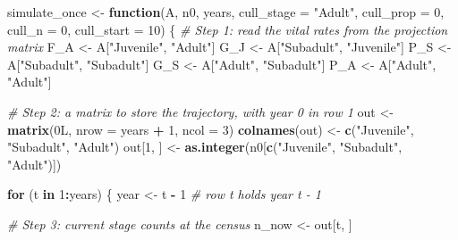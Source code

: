 \documentclass[
  a4paper]{book}
\newenvironment{Shaded}{\begin{snugshade}}{\end{snugshade}}
\newcommand{\AttributeTok}[1]{\textcolor[rgb]{0.13,0.29,0.53}{#1}}
\newcommand{\CommentTok}[1]{\textcolor[rgb]{0.56,0.35,0.01}{\textit{#1}}}
\newcommand{\ControlFlowTok}[1]{\textcolor[rgb]{0.13,0.29,0.53}{\textbf{#1}}}
\newcommand{\DataTypeTok}[1]{\textcolor[rgb]{0.13,0.29,0.53}{#1}}
\newcommand{\DecValTok}[1]{\textcolor[rgb]{0.00,0.00,0.81}{#1}}
\newcommand{\FunctionTok}[1]{\textcolor[rgb]{0.13,0.29,0.53}{\textbf{#1}}}
\newcommand{\NormalTok}[1]{#1}
\newcommand{\OtherTok}[1]{\textcolor[rgb]{0.56,0.35,0.01}{#1}}
\newcommand{\SpecialCharTok}[1]{\textcolor[rgb]{0.81,0.36,0.00}{\textbf{#1}}}
\newcommand{\StringTok}[1]{\textcolor[rgb]{0.31,0.60,0.02}{#1}}
\begin{document}
\begin{Shaded}
\begin{Highlighting}[]
\NormalTok{simulate\_once }\OtherTok{\textless{}{-}} \ControlFlowTok{function}\NormalTok{(A, n0, years,}
                          \AttributeTok{cull\_stage =} \StringTok{"Adult"}\NormalTok{, }\AttributeTok{cull\_prop =} \DecValTok{0}\NormalTok{, }\AttributeTok{cull\_n =} \DecValTok{0}\NormalTok{,}
                          \AttributeTok{cull\_start =} \DecValTok{10}\NormalTok{) \{}
  \CommentTok{\# Step 1: read the vital rates from the projection matrix}
\NormalTok{  F\_A }\OtherTok{\textless{}{-}}\NormalTok{ A[}\StringTok{"Juvenile"}\NormalTok{, }\StringTok{"Adult"}\NormalTok{]}
\NormalTok{  G\_J }\OtherTok{\textless{}{-}}\NormalTok{ A[}\StringTok{"Subadult"}\NormalTok{, }\StringTok{"Juvenile"}\NormalTok{]}
\NormalTok{  P\_S }\OtherTok{\textless{}{-}}\NormalTok{ A[}\StringTok{"Subadult"}\NormalTok{, }\StringTok{"Subadult"}\NormalTok{]}
\NormalTok{  G\_S }\OtherTok{\textless{}{-}}\NormalTok{ A[}\StringTok{"Adult"}\NormalTok{, }\StringTok{"Subadult"}\NormalTok{]}
\NormalTok{  P\_A }\OtherTok{\textless{}{-}}\NormalTok{ A[}\StringTok{"Adult"}\NormalTok{, }\StringTok{"Adult"}\NormalTok{]}

  \CommentTok{\# Step 2: a matrix to store the trajectory, with year 0 in row 1}
\NormalTok{  out }\OtherTok{\textless{}{-}} \FunctionTok{matrix}\NormalTok{(}\DecValTok{0}\DataTypeTok{L}\NormalTok{, }\AttributeTok{nrow =}\NormalTok{ years }\SpecialCharTok{+} \DecValTok{1}\NormalTok{, }\AttributeTok{ncol =} \DecValTok{3}\NormalTok{)}
  \FunctionTok{colnames}\NormalTok{(out) }\OtherTok{\textless{}{-}} \FunctionTok{c}\NormalTok{(}\StringTok{"Juvenile"}\NormalTok{, }\StringTok{"Subadult"}\NormalTok{, }\StringTok{"Adult"}\NormalTok{)}
\NormalTok{  out[}\DecValTok{1}\NormalTok{, ] }\OtherTok{\textless{}{-}} \FunctionTok{as.integer}\NormalTok{(n0[}\FunctionTok{c}\NormalTok{(}\StringTok{"Juvenile"}\NormalTok{, }\StringTok{"Subadult"}\NormalTok{, }\StringTok{"Adult"}\NormalTok{)])}

  \ControlFlowTok{for}\NormalTok{ (t }\ControlFlowTok{in} \DecValTok{1}\SpecialCharTok{:}\NormalTok{years) \{}
\NormalTok{    year }\OtherTok{\textless{}{-}}\NormalTok{ t }\SpecialCharTok{{-}} \DecValTok{1} \CommentTok{\# row t holds year t {-} 1}

    \CommentTok{\# Step 3: current stage counts at the census}
\NormalTok{    n\_now }\OtherTok{\textless{}{-}}\NormalTok{ out[t, ]}


\end{Highlighting}
\end{Shaded}
\end{document}
